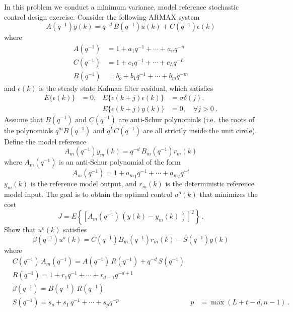 
\item
In this problem we conduct a minimum variance, model reference stochastic control design exercise.
Consider the following ARMAX system
\begin{equation}
    \label{eq:ARMAX}
    A(q^{-1}) y(k) = q^{-d}\, B(q^{-1})u(k) + C(q^{-1}) \epsilon(k)
\end{equation}
where
\begin{align*}
    A(q^{-1}) & = 1 + a_1 q^{-1} + \cdots + a_n q^{-n} \\
    C(q^{-1}) & = 1 + c_1 q^{-1} + \cdots + c_L q^{-L} \\
    B(q^{-1}) & = b_o + b_1 q^{-1} + \cdots + b_m q^{-m}
\end{align*}
and
$\epsilon(k)$ is the steady state Kalman filter residual, which satisfies
\begin{align*}
    E\{ \epsilon(k) \} & = 0,
        & E\{ \epsilon(k+j)\epsilon(k)\} & = \sigma \delta(j), \\
    && E \{ \epsilon(k+j)y(k) \} & = 0, \quad \forall j > 0 \; .
\end{align*}
Assume that $B(q^{-1})$ and $C(q^{-1})$ are anti-Schur polynomials (i.e.\ the roots of the polynomials $q^m B(q^{-1})$ and $q^L C(q^{-1})$ are all strictly inside the unit circle). Define the model reference
\begin{equation}
    \label{eq:model}
    A_m(q^{-1}) y_m(k) = q^{-d}\, B_m(q^{-1})r_m(k)
\end{equation}
where $A_m(q^{-1})$ is an anti-Schur polynomial of the form
\begin{equation}
    \label{eq:am}
    A_m(q^{-1}) = 1 + {a_m}_1 q^{-1} + \cdots + {a_m}_t q^{-t}
\end{equation}
$y_m(k)$ is the reference model output, and $r_m(k)$ is the deterministic reference model input. The goal is to obtain the optimal control $u^o(k)$ that minimizes the cost
\begin{equation}
    \label{eq:cost}
    J = E \left \{ \left [ A_m(q^{-1}) \,( y(k) - y_m(k)\, ) \right ]^2\right \} \,.
\end{equation}
Show that
$u^o(k)$ satisfies
\begin{equation}
    \label{eq:uot_min}
    \beta(q^{-1}) u^o(k) =  C(q^{-1}) B_m(q^{-1})r_m(k)  - S(q^{-1}) y(k)
\end{equation}
where
\begin{align*}
    & C(q^{-1})\, A_m(q^{-1}) = A(q^{-1}) \,R(q^{-1}) + q^{-d}\, S(q^{-1})\\
    & R(q^{-1}) = 1 + r_1 q^{-1} + \cdots + r_{d-1} q^{-d+1} \\
    & \beta(q^{-1}) =  B(q^{-1}) \, R(q^{-1}) \\
    & S(q^{-1}) = s_o + s_1 \, q^{-1} + \cdots + s_p q^{-p}
        & p & = \max(L+t-d,n-1)\,.
\end{align*}
